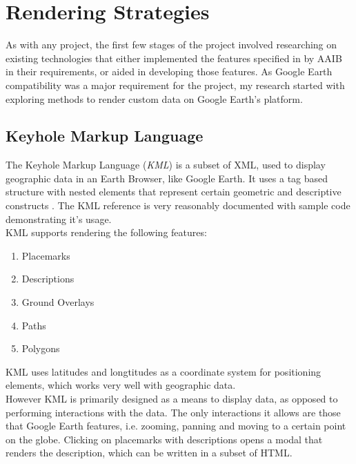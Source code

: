 
\chapter{Rendering Strategies} %

\label{ch:rendering strategies} %

As with any project, the first few stages of the project involved researching on existing technologies that either implemented the features specified in by AAIB in their requirements, or aided in developing those features. As Google Earth compatibility was a major requirement for the project, my research started with exploring
methods to render custom data on Google Earth's platform.


\section{Keyhole Markup Language}

The Keyhole Markup Language (\emph{KML}) is a subset of XML, used to display geographic data in an Earth Browser, like Google Earth. It uses a tag based structure with nested elements that represent certain geometric
and descriptive constructs \citep{google:kml}. The KML reference is very reasonably documented with sample code demonstrating it's usage.\\

KML supports rendering the following features:
\begin{enumerate}
  \item Placemarks
  \item Descriptions
  \item Ground Overlays
  \item Paths
  \item Polygons
\end{enumerate}

KML uses latitudes and longtitudes as a coordinate system for positioning elements, which works very well with geographic data. \\
However KML is primarily designed as a means to display data, as opposed to performing interactions with the data. The only interactions it allows are those that Google Earth features, i.e. zooming, panning and moving to a certain point on the globe. Clicking on placemarks with descriptions opens a modal that renders the description, which can be written in a subset of HTML. \\

